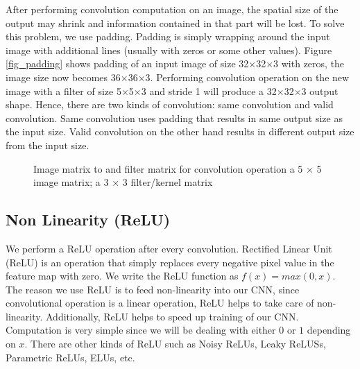 \documentclass[master]{thesis-uestc}
\begin{document}
After performing convolution computation on an image, the spatial size of the output may shrink and information contained in that part will be lost. To solve this problem, we use padding. Padding is simply wrapping around the input image with additional lines (usually with zeros or some other values). Figure \ref{fig_padding} shows padding of an input image of size 32$\times$32$\times$3 with zeros, the image size now becomes 36$\times$36$\times$3. Performing convolution operation on the new image with a filter of size 5$\times$5$\times$3 and stride 1 will produce a 32$\times$32$\times$3 output shape. Hence, there are two kinds of convolution: same convolution and valid convolution. Same convolution uses padding that results in same output size as the input size. Valid convolution on the other hand results in different output size from the input size.
\begin{figure}%
\centering
{}%
\hspace{8pt}%
\caption[Image matrix to and filter matrix for convolution operation]{Image matrix to and filter matrix for convolution operation
 a 5 $\times$ 5 image matrix;
 a 3 $\times$ 3 filter/kernel matrix}
\label{fig:convolution}
\end{figure}

\subsection{Non Linearity (ReLU)}
We perform a ReLU operation after every convolution. Rectified Linear Unit (ReLU) is an operation that simply replaces every negative pixel value in the feature map with zero. We write the ReLU function as $f(x) = max(0,x)$. The reason we use ReLU is to feed non-linearity into our CNN, since convolutional operation is a linear operation, ReLU helps to take care of non-linearity. Additionally, ReLU helps to speed up training of our CNN. Computation is very simple since we will be dealing with either $0$ or $1$ depending on $x$. There are other kinds of ReLU such as Noisy ReLUs, Leaky ReLUSs, Parametric ReLUs, ELUs, etc.
\end{document}
